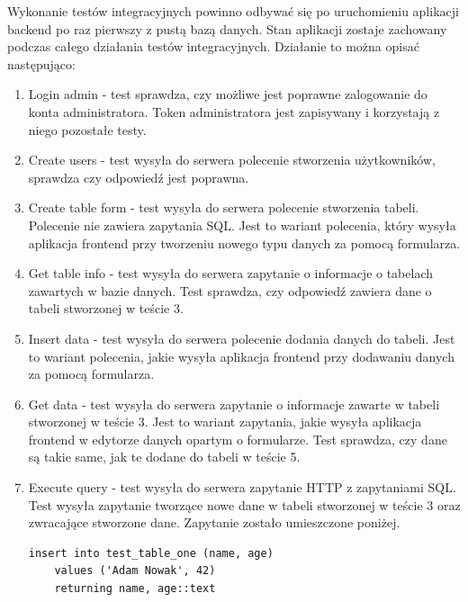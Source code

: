 \FloatBarrier

Wykonanie testów integracyjnych powinno odbywać się po uruchomieniu aplikacji
backend po raz pierwszy z pustą bazą danych. Stan aplikacji zostaje zachowany
podczas całego działania testów integracyjnych. Działanie to można opisać
następująco:

\begin{enumerate}

    \item Login admin - test sprawdza, czy możliwe jest poprawne zalogowanie do
        konta administratora. Token administratora jest zapisywany i korzystają
        z niego pozostałe testy.

    \item Create users - test wysyła do serwera polecenie stworzenia
        użytkowników, sprawdza czy odpowiedź jest poprawna.

    \item Create table form - test wysyła do serwera polecenie stworzenia
        tabeli. Polecenie nie zawiera zapytania SQL. Jest to wariant polecenia,
        który wysyła aplikacja frontend przy tworzeniu nowego typu danych za
        pomocą formularza.

    \item Get table info - test wysyła do serwera zapytanie o informacje o
        tabelach zawartych w bazie danych. Test sprawdza, czy odpowiedź zawiera
        dane o tabeli stworzonej w teście 3.

    \item Insert data - test wysyła do serwera polecenie dodania danych do
        tabeli. Jest to wariant polecenia, jakie wysyła aplikacja frontend przy
        dodawaniu danych za pomocą formularza.

    \item Get data - test wysyła do serwera zapytanie o informacje zawarte w
        tabeli stworzonej w teście 3. Jest to wariant zapytania, jakie wysyła
        aplikacja frontend w edytorze danych opartym o formularze. Test
        sprawdza, czy dane są takie same, jak te dodane do tabeli w teście 5.

    \item Execute query - test wysyła do serwera zapytanie HTTP z zapytaniami
        SQL. Test wysyła zapytanie tworzące nowe dane w tabeli stworzonej w
        teście 3 oraz zwracające stworzone dane. Zapytanie zostało umieszczone
        poniżej.

        \begin{verbatim}
insert into test_table_one (name, age)
    values ('Adam Nowak', 42)
    returning name, age::text
        \end{verbatim}


\end{enumerate}
